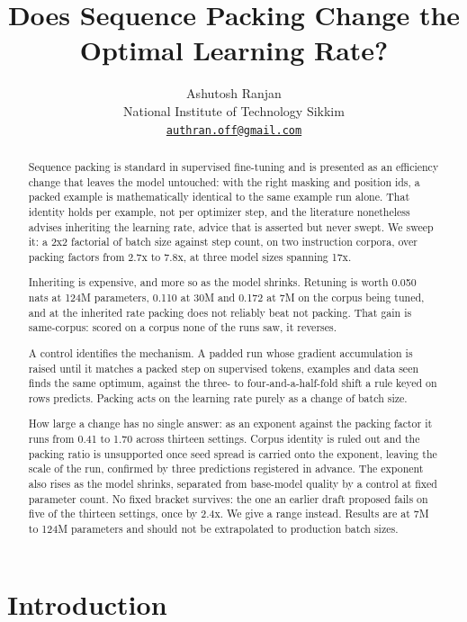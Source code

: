 \documentclass[11pt]{article}
\title{Does Sequence Packing Change the Optimal Learning Rate?}
\author{Ashutosh Ranjan \\ \small National Institute of Technology Sikkim \\
        \small \href{mailto:authran.off@gmail.com}{\texttt{authran.off@gmail.com}}}
\date{}
\begin{document}
\maketitle

\begin{abstract}

Sequence packing is standard in supervised fine-tuning and is presented as an efficiency change that leaves the model untouched: with the right masking and position ids, a packed example is mathematically identical to the same example run alone. That identity holds per example, not per optimizer step, and the literature nonetheless advises inheriting the learning rate, advice that is asserted but never swept. We sweep it: a 2x2 factorial of batch size against step count, on two instruction corpora, over packing factors from 2.7x to 7.8x, at three model sizes spanning 17x.

Inheriting is expensive, and more so as the model shrinks. Retuning is worth 0.050 nats at 124M parameters, 0.110 at 30M and 0.172 at 7M on the corpus being tuned, and at the inherited rate packing does not reliably beat not packing. That gain is same-corpus: scored on a corpus none of the runs saw, it reverses.

A control identifies the mechanism. A padded run whose gradient accumulation is raised until it matches a packed step on supervised tokens, examples and data seen finds the same optimum, against the three- to four-and-a-half-fold shift a rule keyed on rows predicts. Packing acts on the learning rate purely as a change of batch size.

How large a change has no single answer: as an exponent against the packing factor it runs from 0.41 to 1.70 across thirteen settings. Corpus identity is ruled out and the packing ratio is unsupported once seed spread is carried onto the exponent, leaving the scale of the run, confirmed by three predictions registered in advance. The exponent also rises as the model shrinks, separated from base-model quality by a control at fixed parameter count. No fixed bracket survives: the one an earlier draft proposed fails on five of the thirteen settings, once by 2.4x. We give a range instead. Results are at 7M to 124M parameters and should not be extrapolated to production batch sizes.

\end{abstract}

\section{Introduction}
\end{document}
